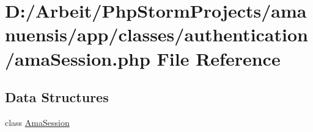 \hypertarget{ama_session_8php}{}\section{D\+:/\+Arbeit/\+Php\+Storm\+Projects/amanuensis/app/classes/authentication/ama\+Session.php File Reference}
\label{ama_session_8php}
\subsection*{Data Structures}
\begin{DoxyCompactItemize}
\item 
class \hyperlink{class_ama_session}{Ama\+Session}
\end{DoxyCompactItemize}
